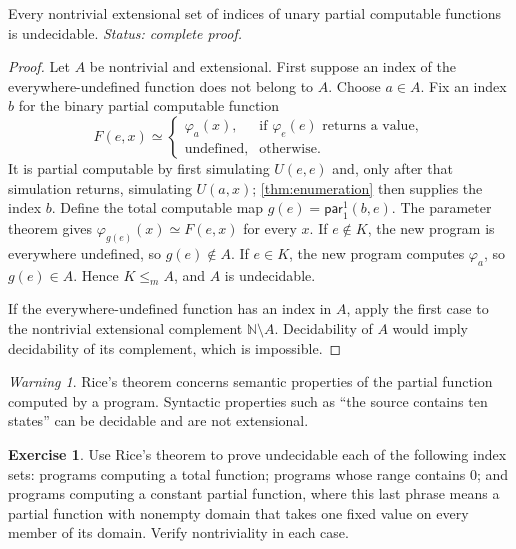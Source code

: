 \documentclass[11pt,oneside,openany]{book}
\theoremstyle{definition}
\newtheorem{exercise}[definition]{Exercise}
\theoremstyle{plain}
\newtheorem{theorem}[definition]{Theorem}
\theoremstyle{remark}
\newtheorem{warning}[definition]{Warning}
\let\LogicTheorem\theorem
\let\endLogicTheorem\endtheorem
\renewenvironment{theorem}[1][]{%
  \LogicTheorem[#1]%
  \if\relax\detokenize{#1}\relax\else\index{#1}\fi
}{\endLogicTheorem}
\newcommand{\N}{\mathbb{N}}
\begin{document}
\begin{theorem}[Rice]
\label{thm:rice}
Every nontrivial extensional set of indices of unary partial computable
functions is undecidable.
\textit{Status: complete proof.}
\end{theorem}

\begin{proof}
Let \(A\) be nontrivial and extensional.  First suppose an index of the
everywhere-undefined function does not belong to \(A\).  Choose \(a\in A\).
Fix an index \(b\) for the binary partial computable function
\[
 F(e,x)\simeq
 \begin{cases}
   \varphi_a(x),&\text{if }\varphi_e(e)\text{ returns a value},\\
   \text{undefined},&\text{otherwise}.
 \end{cases}
\]
It is partial computable by first simulating \(U(e,e)\) and, only after that
simulation returns, simulating \(U(a,x)\); \cref{thm:enumeration} then
supplies the index \(b\).  Define the total computable map
\(g(e)=\mathsf{par}_1^1(b,e)\).  The parameter theorem gives
\(\varphi_{g(e)}(x)\simeq F(e,x)\) for every \(x\).  If \(e\notin K\), the
new program is everywhere undefined, so \(g(e)\notin A\).  If \(e\in K\), the
new program computes \(\varphi_a\), so \(g(e)\in A\).  Hence
\(K\leq_m A\), and \(A\) is undecidable.

If the everywhere-undefined function has an index in \(A\), apply the first
case to the nontrivial extensional complement \(\N\setminus A\).  Decidability
of \(A\) would imply decidability of its complement, which is impossible.
\end{proof}

\begin{warning}
Rice's theorem concerns semantic properties of the partial function computed
by a program.  Syntactic properties such as ``the source contains ten states''
can be decidable and are not extensional.
\end{warning}

\begin{exercise}
\label{ex:universal-reductions-01}
Use Rice's theorem to prove undecidable each of the following index sets:
programs computing a total function; programs whose range contains \(0\); and
programs computing a constant partial function, where this last phrase means a
partial function with nonempty domain that takes one fixed value on every
member of its domain.  Verify nontriviality in each case.
\end{exercise}
\end{document}
